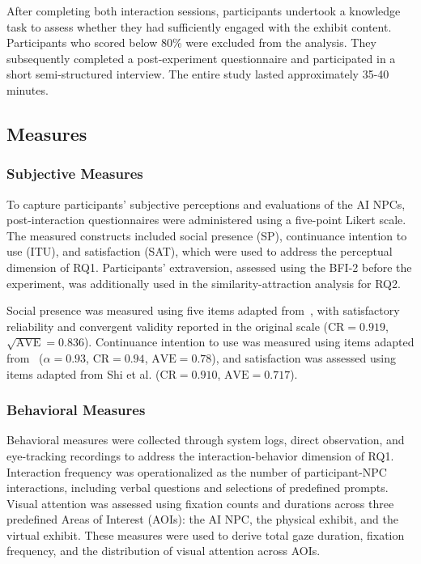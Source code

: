 \documentclass[a4paper,fleqn]{cas-sc}
\begin{document}
After completing both interaction sessions, participants undertook a knowledge task to assess whether they had sufficiently engaged with the exhibit content. Participants who scored below 80\% were excluded from the analysis. They subsequently completed a post-experiment questionnaire and participated in a short semi-structured interview. The entire study lasted approximately 35-40 minutes.

\subsection{Measures}

\subsubsection{Subjective Measures}

To capture participants' subjective perceptions and evaluations of the AI NPCs, post-interaction questionnaires were administered using a five-point Likert scale. The measured constructs included social presence (SP), continuance intention to use (ITU), and satisfaction (SAT), which were used to address the perceptual dimension of RQ1. Participants' extraversion, assessed using the BFI-2 before the experiment, was additionally used in the similarity-attraction analysis for RQ2.

Social presence was measured using five items adapted from~\cite{gefenConsumerTrustB2C2004}, with satisfactory reliability and convergent validity reported in the original scale ($\mathrm{CR}=0.919$, $\sqrt{\mathrm{AVE}}=0.836$). Continuance intention to use was measured using items adapted from~\cite{liChatbotsEcommerceEffect2023} ($\alpha=0.93$, $\mathrm{CR}=0.94$, $\mathrm{AVE}=0.78$), and satisfaction was assessed using items adapted from Shi et al. ($\mathrm{CR}=0.910$, $\mathrm{AVE}=0.717$).

\subsubsection{Behavioral Measures}

Behavioral measures were collected through system logs, direct observation, and eye-tracking recordings to address the interaction-behavior dimension of RQ1. Interaction frequency was operationalized as the number of participant-NPC interactions, including verbal questions and selections of predefined prompts. Visual attention was assessed using fixation counts and durations across three predefined Areas of Interest (AOIs): the AI NPC, the physical exhibit, and the virtual exhibit. These measures were used to derive total gaze duration, fixation frequency, and the distribution of visual attention across AOIs.
\end{document}
